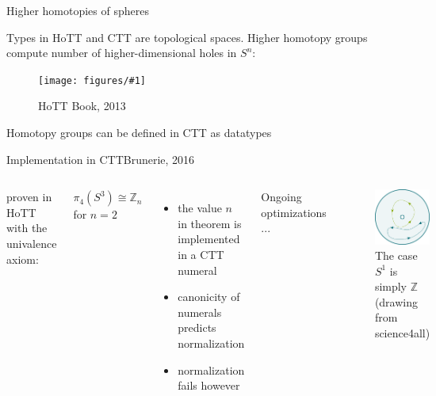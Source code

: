 \documentclass[english]{beamer}
\newcommand{\fig}[2]{
    \begin{figure}\begin{center}\texttt{[image: figures/\#1]}\caption{#2\label{#1}}\end{center}
    \end{figure}}
\begin{document}
\begin{frame}{Higher homotopies of spheres}{}

    Types in HoTT and CTT are topological spaces.
    Higher homotopy groups compute number of higher-dimensional holes in $S^n$:

    \fig{groups}{HoTT Book, 2013}
    Homotopy groups can be defined in CTT as datatypes

\end{frame}


\begin{frame}{Implementation in CTT}{Brunerie, 2016}

 \begin{columns}%
        proven in HoTT with the  univalence axiom:
        \begin{theorem}
            $\pi _ 4 (S^3) \cong \mathbb{Z}_n$ for $n=2$ 

            \end{theorem}
            \begin{itemize}
            \item the value $n$ in theorem is implemented in a CTT numeral
            \item canonicity of numerals predicts normalization 
            \item normalization fails however
            \end{itemize}
        
        Ongoing optimizations ...
        
            \begin{figure}
                \includegraphics[height=0.4\textheight]{figures/loops}
                \caption{The case $S^1$ is simply $\mathbb{Z}$  (drawing from science4all)}
            \end{figure}
    \end{columns}

\end{frame}
\end{document}
